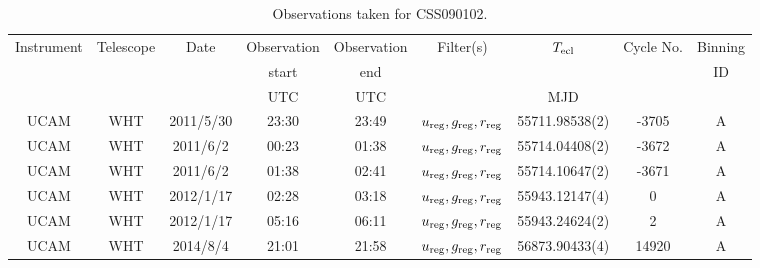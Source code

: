 \begin{table}
	\begin{center}
		\caption{Observations taken for CSS090102.}
		\label{table:observing:observation logs CSS090102}
		\begin{tabular}{ccccccccc}
			\hline
			Instrument & Telescope & Date & Observation  & Observation  & Filter(s) & $T_{\rm ecl}$ & Cycle No. & Binning \\
			 &  &  &  start &  end &  &  &  & ID \\
			 &  &  & UTC & UTC &  & MJD &  &  \\
			\hline
			\hline
			UCAM & WHT & 2011/5/30 & 23:30 & 23:49 & $u_{\rm reg},g_{\rm reg},r_{\rm reg}$ & 55711.98538(2) & -3705 & A \\
			UCAM & WHT & 2011/6/2  & 00:23 & 01:38 & $u_{\rm reg},g_{\rm reg},r_{\rm reg}$ & 55714.04408(2) & -3672 & A \\
			UCAM & WHT & 2011/6/2  & 01:38 & 02:41 & $u_{\rm reg},g_{\rm reg},r_{\rm reg}$ & 55714.10647(2) & -3671 & A \\
			UCAM & WHT & 2012/1/17 & 02:28 & 03:18 & $u_{\rm reg},g_{\rm reg},r_{\rm reg}$ & 55943.12147(4) &     0 & A \\
			UCAM & WHT & 2012/1/17 & 05:16 & 06:11 & $u_{\rm reg},g_{\rm reg},r_{\rm reg}$ & 55943.24624(2) &     2 & A \\
			UCAM & WHT & 2014/8/4  & 21:01 & 21:58 & $u_{\rm reg},g_{\rm reg},r_{\rm reg}$ & 56873.90433(4) & 14920 & A \\
		   \hline
		\end{tabular}
	\end{center}
\end{table}